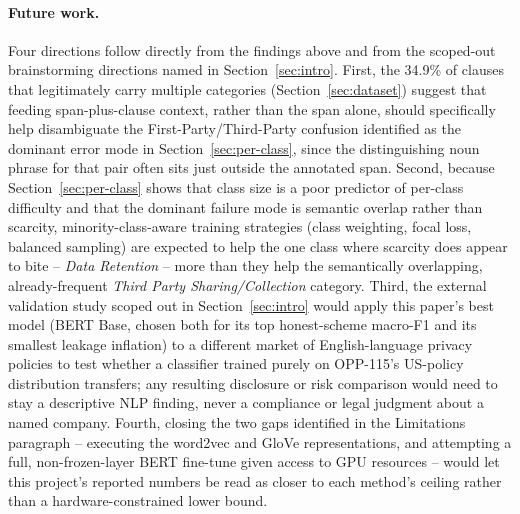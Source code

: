 \documentclass[11pt]{acl}
\begin{document}
\paragraph{Future work.} Four directions follow directly from the findings above and
from the scoped-out brainstorming directions named in Section~\ref{sec:intro}. First,
the 34.9\% of clauses that legitimately carry multiple categories
(Section~\ref{sec:dataset}) suggest that feeding span-plus-clause context, rather than
the span alone, should specifically help disambiguate the First-Party/Third-Party
confusion identified as the dominant error mode in Section~\ref{sec:per-class}, since
the distinguishing noun phrase for that pair often sits just outside the annotated
span. Second, because Section~\ref{sec:per-class} shows that class size is a poor
predictor of per-class difficulty and that the dominant failure mode is semantic overlap
rather than scarcity, minority-class-aware training strategies (class weighting, focal
loss, balanced sampling) are expected to help the one class where scarcity does appear
to bite -- \emph{Data Retention} -- more than they help the semantically overlapping,
already-frequent \emph{Third Party Sharing/Collection} category. Third, the external
validation study scoped out in Section~\ref{sec:intro} would apply this paper's best
model (BERT Base, chosen both for its top honest-scheme macro-F1 and its smallest
leakage inflation) to a different market of English-language privacy policies to test
whether a classifier trained purely on OPP-115's US-policy distribution transfers;
any resulting disclosure or risk comparison would need to stay a descriptive NLP
finding, never a compliance or legal judgment about a named company. Fourth, closing the
two gaps
identified in the Limitations paragraph -- executing the word2vec and GloVe
representations, and attempting a full, non-frozen-layer BERT fine-tune given access to
GPU resources -- would let this project's reported numbers be read as closer to each
method's ceiling rather than a hardware-constrained lower bound.



\end{document}
